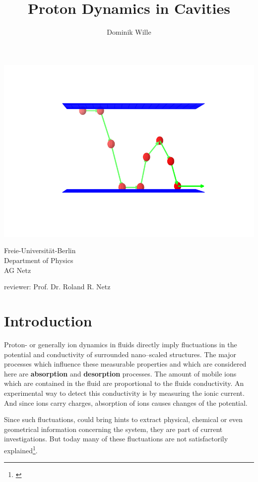 \documentclass[a4paper, parskip=half]{scrartcl}
\title{Proton Dynamics in Cavities}
\author{Dominik Wille}
\newcommand{\effect}[1]{%
	\textbf{#1}%
}
\newcommand{\myCite}[1]{\footnote{\cite{#1} \citeauthor{#1} \citetitle{#1} \citeyear{#1}}}
\begin{document}
\maketitle

\includegraphics[width=\textwidth]{img/title}

\vfill

\enlargethispage{2cm}
  \parbox[t]{0.45\textwidth}{%
   Freie-Universität-Berlin\\
   Department of Physics\\
   AG Netz
  }
  \parbox[t]{0.55\textwidth}{\raggedleft%
     reviewer: Prof. Dr. Roland R. Netz
  }

\thispagestyle{empty}
\newpage
\tableofcontents
\thispagestyle{empty}
\newpage

\section{Introduction}
Proton- or generally ion dynamics in fluids directly imply fluctuations in the potential and conductivity of surrounded nano--scaled structures. The major processes which influence these measurable properties and which are considered here are \effect{absorption} and \effect{desorption} processes. The amount of mobile ions which are contained in the fluid are proportional to the fluids conductivity. An experimental way to detect this conductivity is by measuring the ionic current. And since ions carry charges, absorption of ions causes changes of the potential.

Since such fluctuations, could bring hints to extract physical, chemical or even geometrical information concerning the system, they are part of current investigations. But today many of these fluctuations are not satisfactorily explained\myCite{pinknoise}. 
\end{document}
